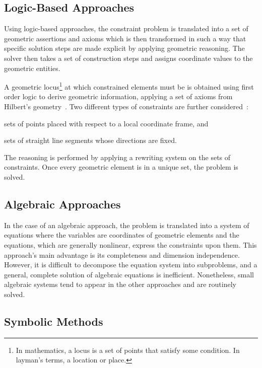 \subsection{Logic-Based Approaches}%
\label{sec:intro.constraints.logic}

Using logic-based approaches, the constraint problem is translated into a set of
geometric assertions and axioms which is then transformed in such a way that
specific solution steps are made explicit by applying geometric reasoning.  The
solver then takes a set of construction steps and assigns coordinate values to
the geometric entities.

A geometric locus\footnote{In mathematics, a locus is a set of points that
satisfy some condition.  In layman's terms, a location or place.} at which
constrained elements must be is obtained using first order logic to derive
geometric information, applying a set of axioms from Hilbert's
geometry~\cite{Aldefeld:1988:VGBGRM,Sohrt:1991:IC3DM,Bruderlin:1993:USGRRSGSS}.
Two different types of constraints are further
considered~\cite{Sunde:1987:CADSDSS,Verroust:1992:RMPCAD}:
\begin{enumerate*}[label= (\arabic*)]
  \item sets of points placed with respect to a local coordinate frame, and
  \item sets of straight line segments whose directions are fixed.
\end{enumerate*}
The reasoning is performed by applying a rewriting system on the sets of
constraints.  Once every geometric element is in a unique set, the problem is
solved.

\subsection{Algebraic Approaches}%
\label{sec:intro.constraints.algebraic}

In the case of an algebraic approach, the problem is translated into a system of
equations where the variables are coordinates of geometric elements and the
equations, which are generally nonlinear, express the constraints upon them.
This approach's main advantage is its completeness and dimension independence.
However, it is difficult to decompose the equation system into subproblems, and
a general, complete solution of algebraic equations is inefficient.
Nonetheless, small algebraic systems tend to appear in the other approaches and
are routinely solved.

\subsection{Symbolic Methods}%
\label{sec:intro.constraints.symbolic}

